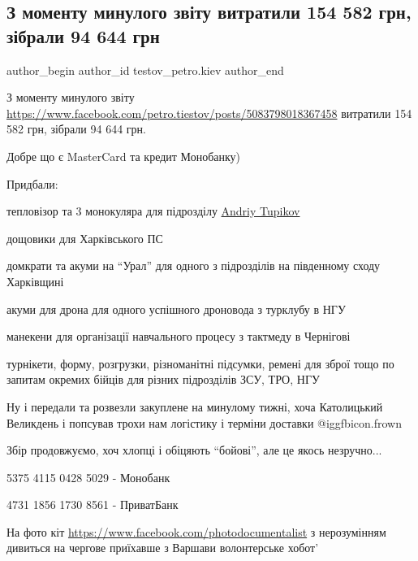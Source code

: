  
 
 
 
 
 
\subsection{З моменту минулого звіту витратили 154 582 грн, зібрали 94 644 грн}
\label{sec:21_04_2022.fb.testov_petro.kiev.1.zvit}
 
\ifcmt
 author_begin
   author_id testov_petro.kiev
 author_end
\fi

З моменту минулого звіту
\url{https://www.facebook.com/petro.tiestov/posts/5083798018367458} витратили
154 582 грн, зібрали 94 644 грн.

Добре що є MasterCard та кредит Монобанку) 

Придбали: 

тепловізор та 3 монокуляра для підрозділу \href{https://www.facebook.com/andriy.tupikov}{Andriy Tupikov}

дощовики для Харківського ПС

домкрати та акуми на \enquote{Урал} для одного з підрозділів на південному сходу
Харківщині 


акуми для дрона для одного успішного дроновода з турклубу в НГУ

манекени для організації навчального процесу з тактмеду в Чернігові

турнікети, форму, розгрузки, різноманітні підсумки, ремені для зброї тощо по
запитам окремих бійців для різних підрозділів ЗСУ, ТРО, НГУ

Ну і передали та розвезли закуплене на минулому тижні, хоча Католицький
Великдень і попсував трохи нам логістику і терміни доставки  @igg{fbicon.frown}  

Збір продовжуємо, хоч хлопці і обіцяють \enquote{бойові}, але це якось незручно...

5375 4115 0428 5029 - Монобанк

4731 1856 1730 8561 - ПриватБанк

На фото кіт \href{Дмитро Демченко Мурзік}{https://www.facebook.com/photodocumentalist} з нерозумінням дивиться на
чергове приїхавше з Варшави волонтерське хобот'
